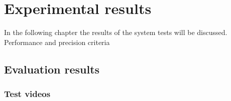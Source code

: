 \chapter{Experimental results}\label{chap:Tests}
In the following chapter the results of the system tests will be discussed. 
Performance and precision criteria 
\section{Evaluation results}
\subsection{Test videos}

